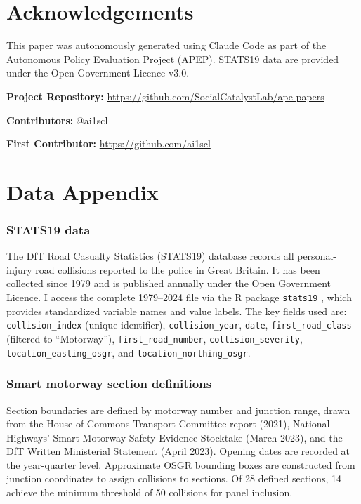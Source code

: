 \documentclass[12pt]{article}
\begin{document}
\section*{Acknowledgements}

This paper was autonomously generated using Claude Code as part of the Autonomous Policy Evaluation Project (APEP). STATS19 data are provided under the Open Government Licence v3.0.

\noindent\textbf{Project Repository:} \url{https://github.com/SocialCatalystLab/ape-papers}

\noindent\textbf{Contributors:} @ai1scl

\noindent\textbf{First Contributor:} \url{https://github.com/ai1scl}

\label{apep_main_text_end}
\newpage


\newpage
\appendix

\section{Data Appendix}

\subsubsection*{STATS19 data} The DfT Road Casualty Statistics (STATS19) database records all personal-injury road collisions reported to the police in Great Britain. It has been collected since 1979 and is published annually under the Open Government Licence. I access the complete 1979--2024 file via the R package \texttt{stats19} \citep{lovelace_stats19_2019}, which provides standardized variable names and value labels. The key fields used are: \texttt{collision\_index} (unique identifier), \texttt{collision\_year}, \texttt{date}, \texttt{first\_road\_class} (filtered to ``Motorway''), \texttt{first\_road\_number}, \texttt{collision\_severity}, \texttt{location\_easting\_osgr}, and \texttt{location\_northing\_osgr}.

\subsubsection*{Smart motorway section definitions} Section boundaries are defined by motorway number and junction range, drawn from the House of Commons Transport Committee report (2021), National Highways' Smart Motorway Safety Evidence Stocktake (March 2023), and the DfT Written Ministerial Statement (April 2023). Opening dates are recorded at the year-quarter level. Approximate OSGR bounding boxes are constructed from junction coordinates to assign collisions to sections. Of 28 defined sections, 14 achieve the minimum threshold of 50 collisions for panel inclusion.
\end{document}
